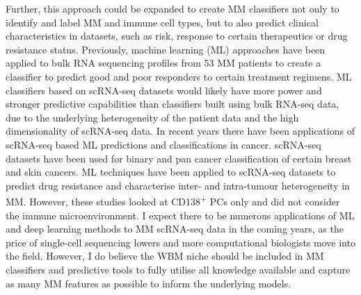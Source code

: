 Further, this approach could be expanded to create MM classifiers not only to identify and label MM and immune cell types, but to also predict clinical characteristics in datasets, such as risk, response to certain therapeutics or drug resistance status.
Previously, machine learning (ML) approaches have been applied to bulk RNA sequencing profiles from 53 MM patients to create a classifier to predict good and poor responders to certain treatment regimens\cite{borisov2021machine}.
ML classifiers based on scRNA-seq datasets would likely have more power and stronger predictive capabilities than classifiers built using bulk RNA-seq data, due to the underlying heterogeneity of the patient data and the high dimensionality of scRNA-seq data.
In recent years there have been applications of scRNA-seq based ML predictions and classifications in cancer.
scRNA-seq datasets have been used for binary and pan cancer classification of certain breast and skin cancers\cite{mahin2022panclassif}.
ML techniques have been applied to scRNA-seq datasets to predict drug resistance and characterise inter- and intra-tumour heterogeneity in MM\cite{kashif2021predicting, johnson2019development}.
However, these studies looked at CD138\textsuperscript{+} PCs only and did not consider the immune microenvironment.
I expect there to be numerous applications of ML and deep learning methods to MM scRNA-seq data in the coming years, as the price of single-cell sequencing lowers and more computational biologists move into the field.
However, I do believe the WBM niche should be included in MM classifiers and predictive tools to fully utilise all knowledge available and capture as many MM features as possible to inform the underlying models.
